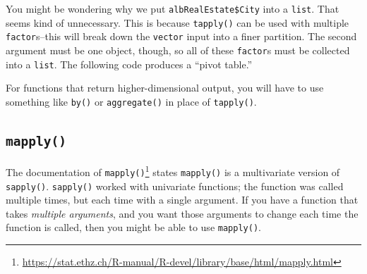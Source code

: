 \documentclass[
  12pt,
  krantz2]{krantz}
\makeatletter
\newenvironment{Shaded}{\begin{snugshade}}{\end{snugshade}}
\newcommand{\DecValTok}[1]{\textcolor[rgb]{0.06,0.06,0.06}{#1}}
\newcommand{\DocumentationTok}[1]{\textcolor[rgb]{0.37,0.37,0.37}{\textbf{\textit{#1}}}}
\newcommand{\FunctionTok}[1]{\textcolor[rgb]{0,0,0}{#1}}
\newcommand{\NormalTok}[1]{#1}
\newcommand{\OtherTok}[1]{\textcolor[rgb]{0.37,0.37,0.37}{#1}}
\newcommand{\SpecialCharTok}[1]{\textcolor[rgb]{0,0,0}{#1}}
\renewcommand{\href}[2]{#2\footnote{\url{#1}}}
\newenvironment{kframe}{%
\medskip{}
\setlength{\fboxsep}{.8em}
 \def\at@end@of@kframe{}%
 \ifinner\ifhmode%
  \def\at@end@of@kframe{\end{minipage}}%
  \begin{minipage}{\columnwidth}%
 \fi\fi%
 \def\FrameCommand##1{\hskip\@totalleftmargin \hskip-\fboxsep
 \colorbox{shadecolor}{##1}\hskip-\fboxsep
     \hskip-\linewidth \hskip-\@totalleftmargin \hskip\columnwidth}%
 \MakeFramed {\advance\hsize-\width
   \@totalleftmargin\z@ \linewidth\hsize
   \@setminipage}}%
 {\par\unskip\endMakeFramed%
 \at@end@of@kframe}
\renewenvironment{Shaded}{\begin{kframe}}{\end{kframe}}
\newenvironment{rmd-details}{\begin{lrbox}{\rmdbox}
  \minipage[c]{\dimexpr \textwidth-2\fboxrule-\wd\bulb-\columnsep}
    \vspace*{\columnsep}}%
{\vspace*{\columnsep}\endminipage\end{lrbox}%
  {\par\color{green}\fboxsep=0pt
    \fbox{\usebox\bulb\usebox\rmdbox\hspace{\columnsep}}\par}}
\makeatother
\begin{document}
You might be wondering why we put \texttt{albRealEstate\$City} into a \texttt{list}. That seems kind of unnecessary. This is because \texttt{tapply()} can be used with multiple \texttt{factor}s--this will break down the \texttt{vector} input into a finer partition. The second argument must be one object, though, so all of these \texttt{factor}s must be collected into a \texttt{list}. The following code produces a ``pivot table.''

\begin{Shaded}
\end{Shaded}

\begin{rmd-details}
For functions that return higher-dimensional output, you will have to use something like \texttt{by()} or \texttt{aggregate()} in place of \texttt{tapply()}.

\end{rmd-details}

\hypertarget{mapply}{%
\subsection{\texorpdfstring{\texttt{mapply()}}{mapply()}}\label{mapply}}

The \href{https://stat.ethz.ch/R-manual/R-devel/library/base/html/mapply.html}{documentation of \texttt{mapply()}} states \texttt{mapply()} is a multivariate version of \texttt{sapply()}. \texttt{sapply()} worked with univariate functions; the function was called multiple times, but each time with a single argument. If you have a function that takes \emph{multiple arguments}, and you want those arguments to change each time the function is called, then you might be able to use \texttt{mapply()}.
\end{document}
